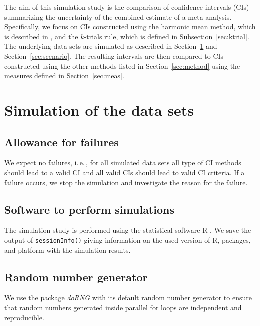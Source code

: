 \documentclass[letterpaper, 9pt]{article}
\newcommand{\ie}{{i.\,e.\,}}
\newcommand{\pkg}[1]{\textit{#1}}
\begin{document}

The aim of this simulation study is the comparison of confidence intervals (CIs) summarizing the uncertainty of the combined estimate of a meta-analysis. Specifically, we focus on CIs constructed using the harmonic mean method, which is described in \citet{Held2020b}, and the $k$-trials rule, which is defined in Subsection~\ref{sec:ktrial}. The underlying data sets are simulated as described in Section~\ref{sec:simproc} and Section~\ref{sec:scenario}. The resulting intervals are then compared to CIs constructed using the other methods listed in Section~\ref{sec:method} using the measures defined in Section~\ref{sec:meas}.


\section{Simulation of the data sets} \label{sec:simproc}

\subsection{Allowance for failures}
We expect no failures, \ie, for all simulated data sets all type of CI methods should lead to a valid CI and all valid CIs should lead to valid CI criteria.
If a failure occurs, we stop the simulation and investigate the reason for the failure. 

\subsection{Software to perform simulations}
The simulation study is performed using the statistical software R \citep{R}.
We save the output of \texttt{sessionInfo()} giving information on the used version of R, packages, and platform with the simulation results.

\subsection{Random number generator}
We use the package \pkg{doRNG} with its default random number generator to ensure that random numbers generated inside parallel for loops are independent and reproducible.
\end{document}
